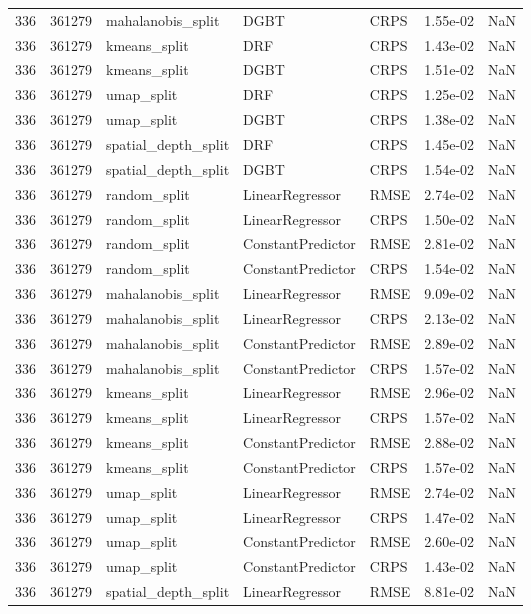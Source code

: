 \begin{tabular}{rrlllrr}
336 & 361279 & mahalanobis\_split & DGBT & CRPS & 1.55e-02 & NaN \\
336 & 361279 & kmeans\_split & DRF & CRPS & 1.43e-02 & NaN \\
336 & 361279 & kmeans\_split & DGBT & CRPS & 1.51e-02 & NaN \\
336 & 361279 & umap\_split & DRF & CRPS & 1.25e-02 & NaN \\
336 & 361279 & umap\_split & DGBT & CRPS & 1.38e-02 & NaN \\
336 & 361279 & spatial\_depth\_split & DRF & CRPS & 1.45e-02 & NaN \\
336 & 361279 & spatial\_depth\_split & DGBT & CRPS & 1.54e-02 & NaN \\
336 & 361279 & random\_split & LinearRegressor & RMSE & 2.74e-02 & NaN \\
336 & 361279 & random\_split & LinearRegressor & CRPS & 1.50e-02 & NaN \\
336 & 361279 & random\_split & ConstantPredictor & RMSE & 2.81e-02 & NaN \\
336 & 361279 & random\_split & ConstantPredictor & CRPS & 1.54e-02 & NaN \\
336 & 361279 & mahalanobis\_split & LinearRegressor & RMSE & 9.09e-02 & NaN \\
336 & 361279 & mahalanobis\_split & LinearRegressor & CRPS & 2.13e-02 & NaN \\
336 & 361279 & mahalanobis\_split & ConstantPredictor & RMSE & 2.89e-02 & NaN \\
336 & 361279 & mahalanobis\_split & ConstantPredictor & CRPS & 1.57e-02 & NaN \\
336 & 361279 & kmeans\_split & LinearRegressor & RMSE & 2.96e-02 & NaN \\
336 & 361279 & kmeans\_split & LinearRegressor & CRPS & 1.57e-02 & NaN \\
336 & 361279 & kmeans\_split & ConstantPredictor & RMSE & 2.88e-02 & NaN \\
336 & 361279 & kmeans\_split & ConstantPredictor & CRPS & 1.57e-02 & NaN \\
336 & 361279 & umap\_split & LinearRegressor & RMSE & 2.74e-02 & NaN \\
336 & 361279 & umap\_split & LinearRegressor & CRPS & 1.47e-02 & NaN \\
336 & 361279 & umap\_split & ConstantPredictor & RMSE & 2.60e-02 & NaN \\
336 & 361279 & umap\_split & ConstantPredictor & CRPS & 1.43e-02 & NaN \\
336 & 361279 & spatial\_depth\_split & LinearRegressor & RMSE & 8.81e-02 & NaN \\

\end{tabular}
